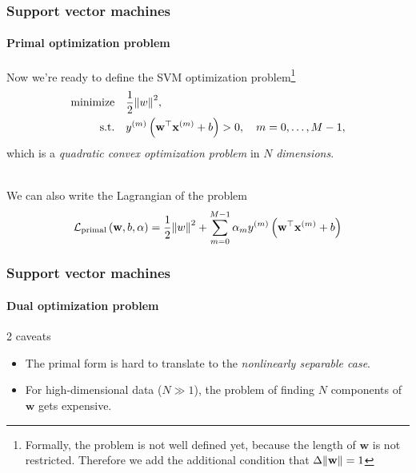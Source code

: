 \documentclass[aspectratio=43]{beamer}
\begin{document}
\begin{frame}
  \frametitle{Support vector machines}
  \framesubtitle{Primal optimization problem}

  Now we're ready to define the SVM optimization problem\footnote{Formally, the problem is not well defined yet, because the length of $\mathbf{{w}}$ is not restricted. Therefore we add the additional condition that $\Delta \norm{\mathbf{w}}=1$}
  \pause
  \begin{align*}
    \mathrm{minimize}& \quad\frac{1}{2}\norm{w}^2,\\
    \mathrm{s.t.}& \quad y^{\left( m \right)}\left( \mathbf{w}^\top \mathbf{x}^{(m)} + b\right) > 0, \quad m={0,\dots, M-1},
  \end{align*}
  which is a \emph{quadratic convex optimization problem} in $N$ \emph{dimensions}.

  \ \\
  \pause
  We can also write the Lagrangian of the problem
  \[\mathcal{L}_{\mathrm{primal}}\left( \mathbf{w}, b, \mathbf{\alpha} \right) = \frac{1}{2}\norm{w}^2 + \sum_{m=0}^{M-1} \alpha_m y^{\left( m \right)}\left( \mathbf{w}^\top \mathbf{x}^{(m)} + b\right) \]

\end{frame}


\begin{frame}
  \frametitle{Support vector machines}
  \framesubtitle{Dual optimization problem}

  2 caveats
  \begin{itemize}
    \item<2-> The primal form is hard to translate to the \emph{nonlinearly separable case}.
    \item<3-> For high-dimensional data ($N \gg 1$), the problem of finding $N$ components of $\mathbf{w}$ gets expensive.
  \end{itemize}

\end{frame}
\end{document}
